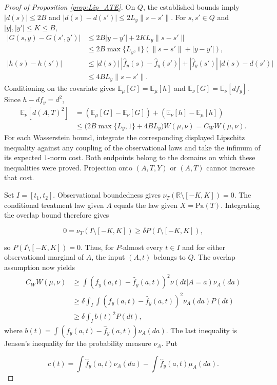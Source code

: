 \begin{proof}[Proof of Proposition \ref{prop:Lip_ATE}]
On $Q$, the established bounds imply $|d(s)|\leqslant2B$ and $|d(s)-d(s')|\leqslant2L_y\|s-s'\|$. For $s,s'\in Q$ and $|y|,|y'|\leqslant K\leqslant B$,
\begin{align*}
|G(s,y)-G(s',y')|
&\leqslant2B|y-y'|+2KL_y\|s-s'\|\\
&\leqslant2B\max\{L_y,1\}(\|s-s'\|+|y-y'|),\\
|h(s)-h(s')|
&\leqslant |d(s)|\,|\hat f_y(s)-\hat f_y(s')|+|\hat f_y(s')|\,|d(s)-d(s')|\\
&\leqslant4BL_y\|s-s'\|.
\end{align*}
Conditioning on the covariate gives $\mathbb{E}_{\mu}[G]=\mathbb{E}_{\mu}[h]$ and $\mathbb{E}_{\nu}[G]=\mathbb{E}_{\nu}[df_y]$. Since $h-df_y=d^2$,
\begin{align*}
\mathbb{E}_{\nu}[d(A,T)^2]
&=(\mathbb{E}_{\mu}[G]-\mathbb{E}_{\nu}[G])+(\mathbb{E}_{\nu}[h]-\mathbb{E}_{\mu}[h])\\
&\leqslant\bigl(2B\max\{L_y,1\}+4BL_y\bigr)W(\mu,\nu)
=C_WW(\mu,\nu).
\end{align*}
For each Wasserstein bound, integrate the corresponding displayed Lipschitz inequality against any coupling of the observational laws and take the infimum of its expected $1$-norm cost. Both endpoints belong to the domains on which these inequalities were proved. Projection onto $(A,T,Y)$ or $(A,T)$ cannot increase that cost. 

Set $I=[t_1,t_2]$. Observational boundedness gives $\nu_T(\mathbb{R}\setminus[-K,K])=0$. The conditional treatment law given $A$ equals the law given $X=\text{Pa}(T)$. Integrating the overlap bound therefore gives

\[
0=\nu_T(I\setminus[-K,K])\geqslant\delta P(I\setminus[-K,K]),
\]

so $P(I\setminus[-K,K])=0$. Thus, for $P$-almost every $t\in I$ and for either observational marginal of $A$, the input $(A,t)$ belongs to $Q$. The overlap assumption now yields
\begin{align*}
C_WW(\mu,\nu)
&\geqslant\int (f_y(a,t)-\hat f_y(a,t))^2\nu(dt|A=a)\nu_A(da)\\
&\geqslant\delta\int_I\int(f_y(a,t)-\hat f_y(a,t))^2\nu_A(da)P(dt)\\
&\geqslant\delta\int_I b(t)^2P(dt),
\end{align*}
where $b(t)=\int(f_y(a,t)-\hat f_y(a,t))\nu_A(da)$. The last inequality is Jensen's inequality for the probability measure $\nu_A$. Put

\[
c(t)=\int\hat f_y(a,t)\nu_A(da)-\int\hat f_y(a,t)\mu_A(da).
\]


\end{proof}
